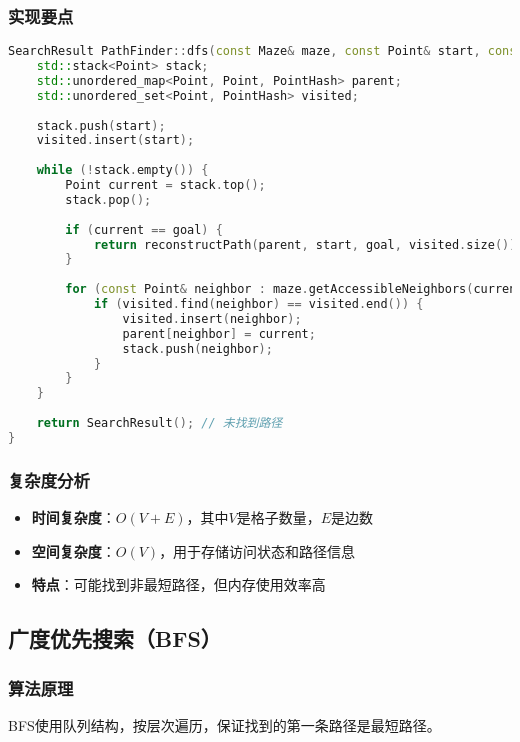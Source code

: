 \documentclass[UTF8]{ctexart}
\begin{document}
\subsubsection{实现要点}
\begin{lstlisting}[language=C++]
SearchResult PathFinder::dfs(const Maze& maze, const Point& start, const Point& goal) {
    std::stack<Point> stack;
    std::unordered_map<Point, Point, PointHash> parent;
    std::unordered_set<Point, PointHash> visited;
    
    stack.push(start);
    visited.insert(start);
    
    while (!stack.empty()) {
        Point current = stack.top();
        stack.pop();
        
        if (current == goal) {
            return reconstructPath(parent, start, goal, visited.size());
        }
        
        for (const Point& neighbor : maze.getAccessibleNeighbors(current)) {
            if (visited.find(neighbor) == visited.end()) {
                visited.insert(neighbor);
                parent[neighbor] = current;
                stack.push(neighbor);
            }
        }
    }
    
    return SearchResult(); // 未找到路径
}
\end{lstlisting}

\subsubsection{复杂度分析}
\begin{itemize}
    \item \textbf{时间复杂度}：$O(V + E)$，其中$V$是格子数量，$E$是边数
    \item \textbf{空间复杂度}：$O(V)$，用于存储访问状态和路径信息
    \item \textbf{特点}：可能找到非最短路径，但内存使用效率高
\end{itemize}

\subsection{广度优先搜索（BFS）}

\subsubsection{算法原理}
BFS使用队列结构，按层次遍历，保证找到的第一条路径是最短路径。
\end{document}
